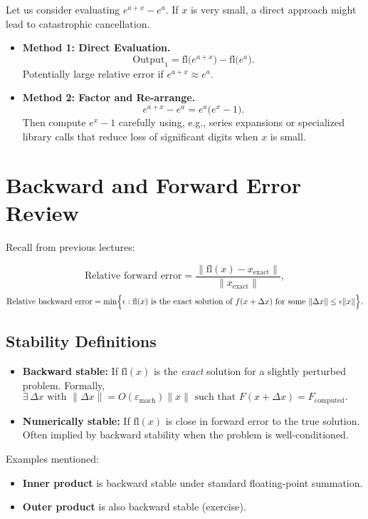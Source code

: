 \documentclass[12pt]{article}
\begin{document}
Let us consider evaluating $\displaystyle e^{a+x} - e^a$. If $x$ is very small, a direct approach might lead to catastrophic cancellation.

\begin{itemize}
  \item \textbf{Method 1: Direct Evaluation.}
  \[
    \mathrm{Output}_1 = \mathrm{fl}\bigl(e^{a+x}\bigr) - \mathrm{fl}\bigl(e^a\bigr).
  \]
  Potentially large relative error if $e^{a+x} \approx e^a$.

  \item \textbf{Method 2: Factor and Re-arrange.}
  \[
    e^{a+x} - e^a = e^a \bigl(e^x - 1\bigr).
  \]
  Then compute $e^x - 1$ carefully using, e.g., series expansions or specialized library calls that reduce loss of significant digits when $x$ is small.  
\end{itemize}

\section*{Backward and Forward Error Review}

Recall from previous lectures:

\[
\text{Relative forward error} 
= \frac{\|\mathrm{fl}(x) - x_{\mathrm{exact}}\|}{\|x_{\mathrm{exact}}\|},
\]
\[
\text{Relative backward error}
= \min\Bigl\{ \epsilon : \mathrm{fl}(x) \text{ is the exact solution of } f(x+\Delta x) \text{ for some } \|\Delta x\| \le \epsilon \|x\|\Bigr\}.
\]

\subsection*{Stability Definitions}

\begin{itemize}
    \item \textbf{Backward stable:} If $\mathrm{fl}(x)$ is the \emph{exact} solution for a slightly perturbed problem. Formally, $\exists\,\Delta x \text{ with } \|\Delta x\| = O(\varepsilon_{\mathrm{mach}}) \|x\|\text{ such that } F(x+\Delta x) = F_{\mathrm{computed}}.$
    \item \textbf{Numerically stable:} If $\mathrm{fl}(x)$ is close in forward error to the true solution. Often implied by backward stability when the problem is well-conditioned.
\end{itemize}

Examples mentioned:
\begin{itemize}
    \item \textbf{Inner product} is backward stable under standard floating-point summation.
    \item \textbf{Outer product} is also backward stable (exercise).
\end{itemize}
\end{document}
